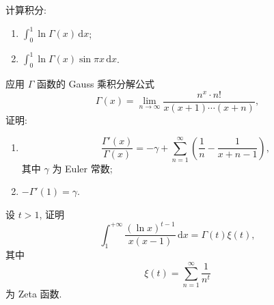 \documentclass[../数学分析培优讲义.tex]{subfiles}
\begin{document}
\begin{example}
计算积分:
\begin{enumerate}[label=(\arabic*)]
    \item $\displaystyle\int_0^1\ln\Gamma(x)\,\mathrm{d}x$;
    \item $\displaystyle\int_0^1\ln\Gamma(x)\sin\pi x\,\mathrm{d}x$.
\end{enumerate}
\end{example}
\exampleblank

\begin{example}[\markstar]
应用 $\Gamma$ 函数的 Gauss 乘积分解公式
\[
    \Gamma(x)=\lim\limits_{n\to\infty}\dfrac{n^x\cdot n!}{x(x+1)\cdots(x+n)},
\]
证明:
\begin{enumerate}[label=(\arabic*)]
    \item
    \[
        \dfrac{\Gamma'(x)}{\Gamma(x)}
        =-\gamma+\sum\limits_{n=1}^{\infty}\left(\dfrac{1}{n}-\dfrac{1}{x+n-1}\right),
    \]
    其中 $\gamma$ 为 Euler 常数;
    \item $-\Gamma'(1)=\gamma$.
\end{enumerate}
\end{example}
\exampleblank

\begin{example}[\markstar]
设 $t>1$, 证明
\[
    \int_1^{+\infty}\dfrac{(\ln x)^{t-1}}{x(x-1)}\,\mathrm{d}x
    =\Gamma(t)\xi(t),
\]
其中
\[
    \xi(t)=\sum\limits_{n=1}^{\infty}\dfrac{1}{n^t}
\]
为 Zeta 函数.
\end{example}
\exampleblank
\end{document}
